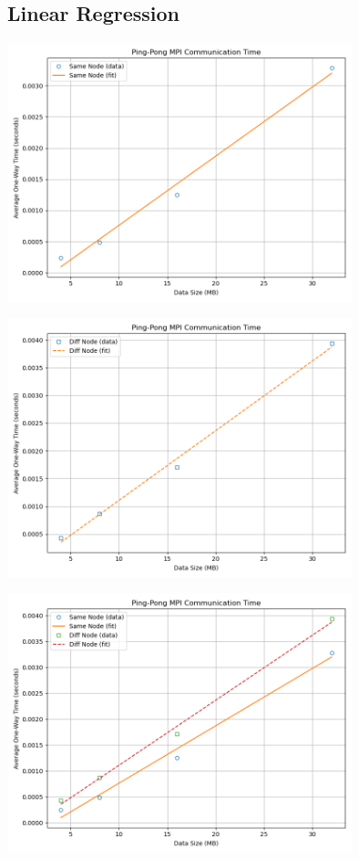 \documentclass[11pt]{article}
\begin{document}
\subsection{Linear Regression}
\label{sec:orgd0d9f88}

\begin{center}
\includegraphics[width=10cm]{./img/pingpong_same_plot.png}
\end{center}

\begin{center}
\includegraphics[width=10cm]{./img/pingpong_diff_plot.png}
\end{center}

\begin{center}
\includegraphics[width=10cm]{./img/pingpong_communication_plot.png}
\end{center}
\newpage
\end{document}
